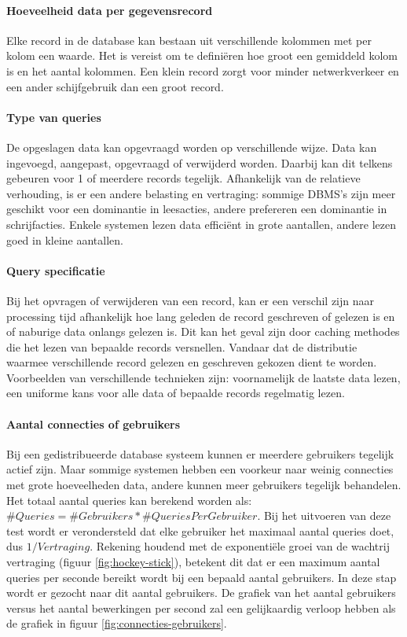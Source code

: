\paragraph{Hoeveelheid data per gegevensrecord} Elke record in de database kan bestaan uit verschillende kolommen met per kolom een waarde. Het is vereist om te definiëren hoe groot een gemiddeld kolom is en het aantal kolommen. Een klein record zorgt voor minder netwerkverkeer en een ander schijfgebruik dan een groot record. 

\paragraph{Type van queries} De opgeslagen data kan opgevraagd worden op verschillende wijze. Data kan ingevoegd, aangepast, opgevraagd of verwijderd worden. Daarbij kan dit telkens gebeuren voor 1 of meerdere records tegelijk. Afhankelijk van de relatieve verhouding, is er een andere belasting en vertraging: sommige DBMS's zijn meer geschikt voor een dominantie in leesacties, andere prefereren een dominantie in schrijfacties. Enkele systemen lezen data efficiënt in grote aantallen, andere lezen goed in kleine aantallen. 

\paragraph{Query specificatie} Bij het opvragen of verwijderen van een record, kan er een verschil zijn naar processing tijd afhankelijk hoe lang geleden de record geschreven of gelezen is en of naburige data onlangs gelezen is. Dit kan het geval zijn door caching methodes die het lezen van bepaalde records versnellen. Vandaar dat de distributie waarmee verschillende record gelezen en geschreven gekozen dient te worden. Voorbeelden van verschillende technieken zijn: voornamelijk de laatste data lezen, een uniforme kans voor alle data of bepaalde records regelmatig lezen.

\paragraph{Aantal connecties of gebruikers} Bij een gedistribueerde database systeem kunnen er meerdere gebruikers tegelijk actief zijn. Maar sommige systemen hebben een voorkeur naar weinig connecties met grote hoeveelheden data, andere kunnen meer gebruikers tegelijk behandelen. Het totaal aantal queries kan berekend worden als: $\#Queries = \#Gebruikers * \#QueriesPerGebruiker$. Bij het uitvoeren van deze test wordt er verondersteld dat elke gebruiker het maximaal aantal queries doet, dus $1/Vertraging$. Rekening houdend met de exponentiële groei van de wachtrij vertraging (figuur \ref{fig:hockey-stick}), betekent dit dat er een maximum aantal queries per seconde bereikt wordt bij een bepaald aantal gebruikers. In deze stap wordt er gezocht naar dit aantal gebruikers. De grafiek van het aantal gebruikers versus het aantal bewerkingen per second zal een gelijkaardig verloop hebben als de grafiek in figuur \ref{fig:connecties-gebruikers}. 

